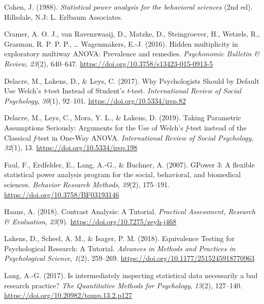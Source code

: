 \documentclass[
  english,
  ,jou,floatsintext]{apa6}
\begin{document}
\leavevmode\hypertarget{ref-cohen_statistical_1988}{}%
Cohen, J. (1988). \emph{Statistical power analysis for the behavioral sciences} (2nd ed). Hillsdale, N.J: L. Erlbaum Associates.

\leavevmode\hypertarget{ref-cramer_hidden_2016}{}%
Cramer, A. O. J., van Ravenzwaaij, D., Matzke, D., Steingroever, H., Wetzels, R., Grasman, R. P. P. P., \ldots{} Wagenmakers, E.-J. (2016). Hidden multiplicity in exploratory multiway ANOVA: Prevalence and remedies. \emph{Psychonomic Bulletin \& Review}, \emph{23}(2), 640--647. \url{https://doi.org/10.3758/s13423-015-0913-5}

\leavevmode\hypertarget{ref-delacre_why_2017}{}%
Delacre, M., Lakens, D., \& Leys, C. (2017). Why Psychologists Should by Default Use Welch's \emph{t}-test Instead of Student's \emph{t}-test. \emph{International Review of Social Psychology}, \emph{30}(1), 92--101. \url{https://doi.org/10.5334/irsp.82}

\leavevmode\hypertarget{ref-delacre_taking_2019}{}%
Delacre, M., Leys, C., Mora, Y. L., \& Lakens, D. (2019). Taking Parametric Assumptions Seriously: Arguments for the Use of Welch's \emph{f}-test instead of the Classical \emph{f}-test in One-Way ANOVA. \emph{International Review of Social Psychology}, \emph{32}(1), 13. \url{https://doi.org/10.5334/irsp.198}

\leavevmode\hypertarget{ref-faul_gpower_2007}{}%
Faul, F., Erdfelder, E., Lang, A.-G., \& Buchner, A. (2007). GPower 3: A flexible statistical power analysis program for the social, behavioral, and biomedical sciences. \emph{Behavior Research Methods}, \emph{39}(2), 175--191. \url{https://doi.org/10.3758/BF03193146}

\leavevmode\hypertarget{ref-haans_contrast_2018}{}%
Haans, A. (2018). Contrast Analysis: A Tutorial. \emph{Practical Assessment, Research \& Evaluation}, \emph{23}(9). \url{https://doi.org/10.7275/zeyh-j468}

\leavevmode\hypertarget{ref-lakens_equivalence_2018}{}%
Lakens, D., Scheel, A. M., \& Isager, P. M. (2018). Equivalence Testing for Psychological Research: A Tutorial. \emph{Advances in Methods and Practices in Psychological Science}, \emph{1}(2), 259--269. \url{https://doi.org/10.1177/2515245918770963}

\leavevmode\hypertarget{ref-lang2017intermediately}{}%
Lang, A.-G. (2017). Is intermediately inspecting statistical data necessarily a bad research practice? \emph{The Quantitative Methods for Psychology}, \emph{13}(2), 127--140. \url{https://doi.org/10.20982/tqmp.13.2.p127}
\end{document}
